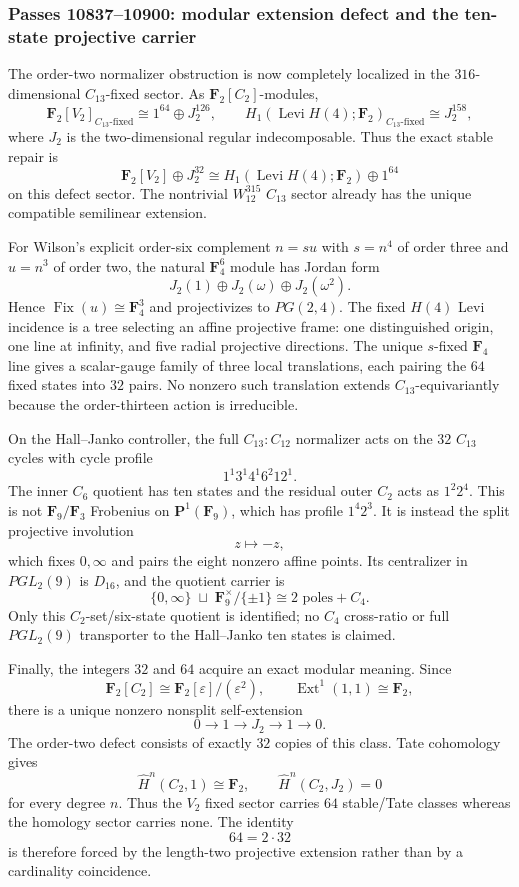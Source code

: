 \subsubsection*{Passes 10837--10900: modular extension defect and the ten-state projective carrier}
The order-two normalizer obstruction is now completely localized in the
$316$-dimensional $C_{13}$-fixed sector.  As $\mathbf F_2[C_2]$-modules,
\[
 \mathbf F_2[V_2]_{C_{13}\text{-fixed}}\cong 1^{64}\oplus J_2^{126},
 \qquad
 H_1(\operatorname{Levi}H(4);\mathbf F_2)_{C_{13}\text{-fixed}}
 \cong J_2^{158},
\]
where $J_2$ is the two-dimensional regular indecomposable.  Thus the exact
stable repair is
\[
 \mathbf F_2[V_2]\oplus J_2^{32}
 \cong
 H_1(\operatorname{Levi}H(4);\mathbf F_2)\oplus 1^{64}
\]
on this defect sector.  The nontrivial $W_{12}^{315}$ $C_{13}$ sector already
has the unique compatible semilinear extension.

For Wilson's explicit order-six complement $n=su$ with $s=n^4$ of order three
and $u=n^3$ of order two, the natural $\mathbf F_4^6$ module has Jordan form
\[
 J_2(1)\oplus J_2(\omega)\oplus J_2(\omega^2).
\]
Hence $\operatorname{Fix}(u)\cong\mathbf F_4^3$ and projectivizes to
$PG(2,4)$.  The fixed $H(4)$ Levi incidence is a tree selecting an affine
projective frame: one distinguished origin, one line at infinity, and five
radial projective directions.  The unique $s$-fixed $\mathbf F_4$ line gives a
scalar-gauge family of three local translations, each pairing the $64$ fixed
states into $32$ pairs.  No nonzero such translation extends
$C_{13}$-equivariantly because the order-thirteen action is irreducible.

On the Hall--Janko controller, the full $C_{13}{:}C_{12}$ normalizer acts on
the $32$ $C_{13}$ cycles with cycle profile
\[
 1^1 3^1 4^1 6^2 12^1.
\]
The inner $C_6$ quotient has ten states and the residual outer $C_2$ acts as
$1^2 2^4$.  This is not $\mathbf F_9/\mathbf F_3$ Frobenius on
$\mathbf P^1(\mathbf F_9)$, which has profile $1^4 2^3$.  It is instead the
split projective involution
\[
 z\longmapsto-z,
\]
which fixes $0,\infty$ and pairs the eight nonzero affine points.  Its
centralizer in $PGL_2(9)$ is $D_{16}$, and the quotient carrier is
\[
 \boxed{\{0,\infty\}\;\sqcup\;\mathbf F_9^\times/\{\pm1\}}
 \cong 2\text{ poles}+C_4.
\]
Only this $C_2$-set/six-state quotient is identified; no $C_4$ cross-ratio or
full $PGL_2(9)$ transporter to the Hall--Janko ten states is claimed.

Finally, the integers $32$ and $64$ acquire an exact modular meaning.  Since
\[
 \mathbf F_2[C_2]\cong\mathbf F_2[\varepsilon]/(\varepsilon^2),
 \qquad
 \operatorname{Ext}^1(1,1)\cong\mathbf F_2,
\]
there is a unique nonzero nonsplit self-extension
\[
 0\longrightarrow1\longrightarrow J_2\longrightarrow1\longrightarrow0.
\]
The order-two defect consists of exactly $32$ copies of this class.  Tate
cohomology gives
\[
 \widehat H^n(C_2,1)\cong\mathbf F_2,
 \qquad
 \widehat H^n(C_2,J_2)=0
\]
for every degree $n$.  Thus the $V_2$ fixed sector carries $64$ stable/Tate
classes whereas the homology sector carries none.  The identity
\[
 \boxed{64=2\cdot32}
\]
is therefore forced by the length-two projective extension rather than by a
cardinality coincidence.
